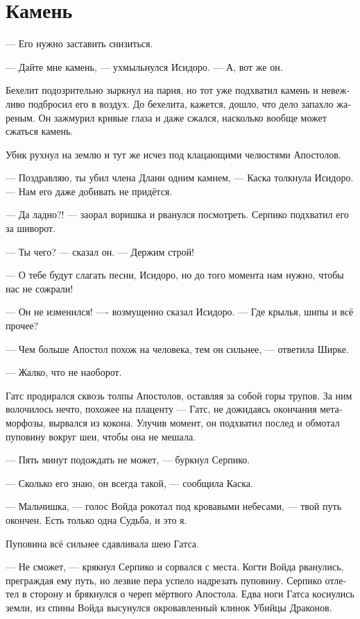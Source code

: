 \documentclass[a4paper,12pt,fleqn]{book}\usepackage{polyglossia}\setdefaultlanguage[babelshorthands=true]{russian}\setotherlanguage{english}\defaultfontfeatures{Ligatures=TeX,Mapping=tex-text}\usepackage{xcolor}\newcommand{\ml}[3]{#2}
\newcommand{\textspace}{\vspace{1em}{\centering\Large\bfseries<...>\par}\vspace{1em}}
\begin{document}
\section{Камень}

--- Его нужно заставить снизиться.

--- Дайте мне камень, --- ухмыльнулся Исидоро.
--- А, вот же он.

Бехелит подозрительно зыркнул на парня, но тот уже подхватил камень и невежливо подбросил его в воздух.
До бехелита, кажется, дошло, что дело запахло жареным.
Он зажмурил кривые глаза и даже сжался, насколько вообще может сжаться камень.

\textspace

Убик рухнул на землю и тут же исчез под клацающими челюстями Апостолов.

--- Поздравляю, ты убил члена Длани одним камнем, --- Каска толкнула Исидоро.
--- Нам его даже добивать не придётся.

--- Да ладно?! --- заорал воришка и рванулся посмотреть.
Серпико подхватил его за шиворот.

--- Ты чего? --- сказал он.
--- Держим строй!

--- О тебе будут слагать песни, Исидоро, но до того момента нам нужно, чтобы нас не сожрали!

\textspace

--- Он не изменился! ---- возмущенно сказал Исидоро.
--- Где крылья, шипы и всё прочее?

--- Чем больше Апостол похож на человека, тем он сильнее, --- ответила Ширке.

--- Жалко, что не наоборот.

\textspace

Гатс продирался сквозь толпы Апостолов, оставляя за собой горы трупов.
За ним волочилось нечто, похожее на плаценту --- Гатс, не дожидаясь окончания метаморфозы, вырвался из кокона.
Улучив момент, он подхватил послед и обмотал пуповину вокруг шеи, чтобы она не мешала.

--- Пять минут подождать не может, --- буркнул Серпико.

--- Сколько его знаю, он всегда такой, --- сообщила Каска. 

\textspace

--- Мальчишка, --- голос Войда рокотал под кровавыми небесами, --- твой путь окончен.
Есть только одна Судьба, и это я.

Пуповина всё сильнее сдавливала шею Гатса.

--- Не сможет, --- крякнул Серпико и сорвался с места.
Когти Войда рванулись, преграждая ему путь, но лезвие пера успело надрезать пуповину.
Серпико отлетел в сторону и брякнулся о череп мёртвого Апостола.
Едва ноги Гатса коснулись земли, из спины Войда высунулся окровавленный клинок Убийцы Драконов.
\end{document}
